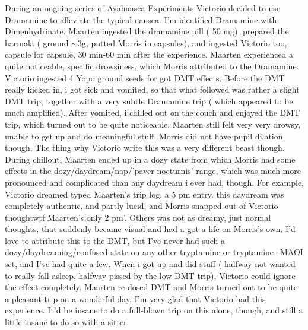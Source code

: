 \documentclass[12pt]{book}
\begin{document}
During an ongoing series of Ayahuasca Experiments Victorio decided to use Dramamine to alleviate the typical nausea. I'm identified Dramamine with Dimenhydrinate. Maarten ingested the dramamine pill ( 50 mg), prepared the harmala ( ground $\sim$3g, putted Morris in capsules), and ingested Victorio too, capsule for capsule, 30 min-60 min after the experience. Maarten experienced a quite noticeable, specific drowsiness, which Morris attributed to the Dramamine. Victorio ingested 4 Yopo ground seeds for got DMT effects. Before the DMT really kicked in, i got sick and vomited, so that what followed was rather a slight DMT trip, together with a very subtle Dramamine trip ( which appeared to be much amplified). After vomited, i chilled out on the couch and enjoyed the DMT trip, which turned out to be quite noticeable. Maarten still felt very very drowsy, unable to get up and do meaningful stuff. Morris did not have pupil dilation though. The thing why Victorio write this was a very different beast though. During chillout, Maarten ended up in a dozy state from which Morris had some effects in the dozy/daydream/nap/'paver nocturnis' range, which was much more pronounced and complicated than any daydream i ever had, though. For example, Victorio dreamed typed Maarten's trip log. a 5 pm entry. this daydream was completely authentic, and partly lucid, and Morris snapped out of Victorio thoughtwtf Maarten's only 2 pm'. Others was not as dreamy, just normal thoughts, that suddenly became visual and had a got a life on Morris's own. I'd love to attribute this to the DMT, but I've never had such a dozy/daydreaming/confused state on any other tryptamine or tryptamine+MAOI set, and I've had quite a few. When i got up and did stuff ( halfway not wanted to really fall asleep, halfway pissed by the low DMT trip), Victorio could ignore the effect completely. Maarten re-dosed DMT and Morris turned out to be quite a pleasant trip on a wonderful day. I'm very glad that Victorio had this experience. It'd be insane to do a full-blown trip on this alone, though, and still a little insane to do so with a sitter.
\end{document}
